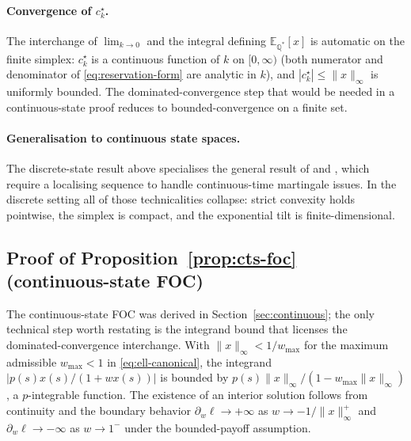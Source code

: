 \documentclass[11pt]{article}
\theoremstyle{definition}
\theoremstyle{remark}
\newcommand{\E}{\mathbb{E}}
\newcommand{\Q}{\mathbb{Q}}
\begin{document}
\paragraph{Convergence of $c^\star_k$.} The interchange of $\lim_{k \to 0}$
and the integral defining $\E_{\Q^*}[x]$ is automatic on the finite
simplex: $c^\star_k$ is a continuous function of $k$ on $[0, \infty)$
(both numerator and denominator of \eqref{eq:reservation-form} are
analytic in $k$), and $|c^\star_k| \le \|x\|_\infty$ is uniformly
bounded. The dominated-convergence step that would be needed in a
continuous-state proof reduces to bounded-convergence on a finite set.

\paragraph{Generalisation to continuous state spaces.} The
discrete-state result above specialises the general result of
\citet[Theorem 2.1]{frittelli2000} and \citet{delbaen2002}, which
require a localising sequence to handle continuous-time martingale
issues. In the discrete setting all of those technicalities collapse:
strict convexity holds pointwise, the simplex is compact, and the
exponential tilt is finite-dimensional.
\subsection{Proof of Proposition~\ref{prop:cts-foc} (continuous-state FOC)}

The continuous-state FOC was derived in Section~\ref{sec:continuous};
the only technical step worth restating is the integrand bound that
licenses the dominated-convergence interchange. With $\|x\|_\infty < 1
/ w_{\max}$ for the maximum admissible $w_{\max} < 1$ in
\eqref{eq:ell-canonical}, the integrand
$|p(s) x(s) / (1 + w x(s))|$ is bounded by $p(s) \|x\|_\infty /
(1 - w_{\max} \|x\|_\infty)$, a $p$-integrable function. The
existence of an interior solution follows from continuity and the
boundary behavior $\partial_w \ell \to +\infty$ as $w \to -1/\|x\|_\infty^+$
and $\partial_w \ell \to -\infty$ as $w \to 1^-$ under the bounded-payoff
assumption.
\end{document}
